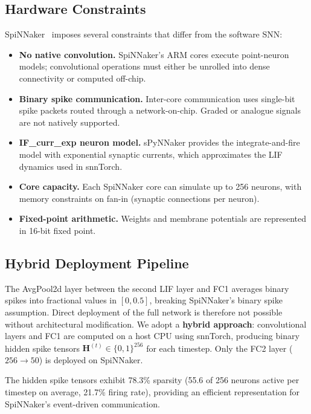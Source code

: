 \subsection{Hardware Constraints}
\label{ssec:hw-constraints}

SpiNNaker~\citep{furber2014spinnaker} imposes several constraints that differ from the software SNN:
\begin{itemize}[nosep]
    \item \textbf{No native convolution.} SpiNNaker's ARM cores execute point-neuron models; convolutional operations must either be unrolled into dense connectivity or computed off-chip.
    \item \textbf{Binary spike communication.} Inter-core communication uses single-bit spike packets routed through a network-on-chip. Graded or analogue signals are not natively supported.
    \item \textbf{IF\_curr\_exp neuron model.} sPyNNaker provides the integrate-and-fire model with exponential synaptic currents, which approximates the LIF dynamics used in snnTorch.
    \item \textbf{Core capacity.} Each SpiNNaker core can simulate up to 256 neurons, with memory constraints on fan-in (synaptic connections per neuron).
    \item \textbf{Fixed-point arithmetic.} Weights and membrane potentials are represented in 16-bit fixed point.
\end{itemize}

\subsection{Hybrid Deployment Pipeline}
\label{ssec:hybrid-pipeline}

The AvgPool2d layer between the second LIF layer and FC1 averages binary spikes into fractional values in $[0, 0.5]$, breaking SpiNNaker's binary spike assumption. Direct deployment of the full network is therefore not possible without architectural modification. We adopt a \textbf{hybrid approach}: convolutional layers and FC1 are computed on a host CPU using snnTorch, producing binary hidden spike tensors $\mathbf{H}^{(t)} \in \{0, 1\}^{256}$ for each timestep. Only the FC2 layer ($256 \to 50$) is deployed on SpiNNaker.

The hidden spike tensors exhibit 78.3\% sparsity (55.6 of 256 neurons active per timestep on average, 21.7\% firing rate), providing an efficient representation for SpiNNaker's event-driven communication.

